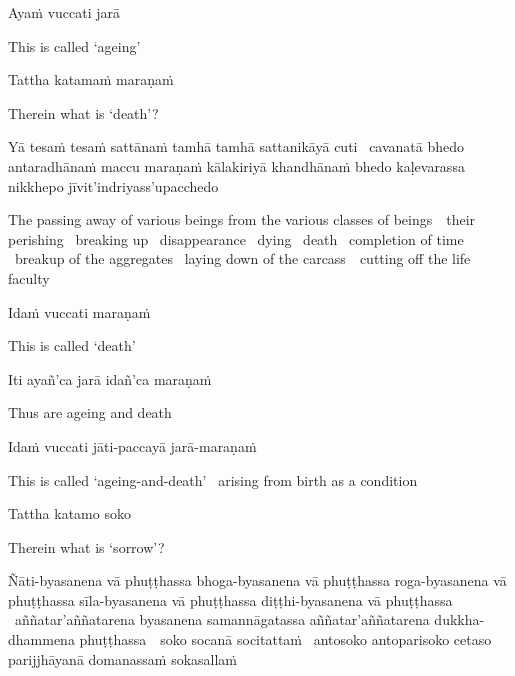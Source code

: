 Ayaṁ vuccati jarā

\begin{english}
  This is called `ageing'
\end{english}

Tattha katamaṁ maraṇaṁ

\begin{english}
  Therein what is `death'?
\end{english}

\begin{pali-hang}
  Yā tesaṁ tesaṁ sattānaṁ tamhā tamhā sattanikāyā cuti \breathmark\ cavanatā bhedo antaradhānaṁ maccu maraṇaṁ kālakiriyā khandhānaṁ bhedo kaḷevarassa nikkhepo jīvit'indriyass'upacchedo
\end{pali-hang}

\begin{english-hang-verses}
  The passing away of various beings from the various classes of \mbox{beings}~\breathmark\ their perishing \breathmark\ breaking up \breathmark\ disappearance \breathmark\ dying \breathmark\ death \breathmark\ completion of time \breathmark\ breakup of the aggregates \breathmark\ laying down of the \mbox{carcass}~\breathmark\ cutting off the life faculty
\end{english-hang-verses}

Idaṁ vuccati maraṇaṁ

\begin{english}
  This is called `death'
\end{english}

Iti ayañ'ca jarā idañ'ca maraṇaṁ

\begin{english}
  Thus are ageing and death
\end{english}

Idaṁ vuccati jāti-paccayā jarā-maraṇaṁ

\begin{english-hang}
  This is called `ageing-and-death' \breathmark\ arising from birth as a condition
\end{english-hang}

Tattha katamo soko

\begin{english}
  Therein what is `sorrow'?
\end{english}

\ifninebythirteen\clearpage\fi

\begin{pali-hang}
  Ñāti-byasanena vā phuṭṭhassa bhoga-byasanena vā phuṭṭhassa roga-byasanena vā phuṭṭhassa sīla-byasanena vā phuṭṭhassa diṭṭhi-byasanena vā phuṭṭhassa \breathmark\ aññatar'aññatarena byasanena samannāgatassa aññatar'aññatarena dukkha-dhammena \mbox{phuṭṭhassa}~\breathmark\ soko socanā socitattaṁ \breathmark\ antosoko antoparisoko cetaso parijjhāyanā domanassaṁ sokasallaṁ
\end{pali-hang}

